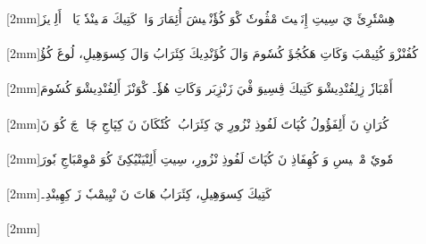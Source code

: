 \documentclass[a4paper, 12pt]{report}
\begin{document}
\begin{flushright}

{\scriptsize{}[2mm]}\textarabic{هِسْتٗرِئَ يَ سِيتِ إِنَلٖيتَ مْڤُوتٗ كْوَ كُؤٗنْيٖيشَ أُئِمَارَ وَاكٖ كَتِيكَ مَتٖينْدٗ يَاكٖ۔ أَلِوٖيزَ} \\ 

 \\ 

{\scriptsize{}[2mm]}\textarabic{كُفُنْزْوَ كُئِيمْبَ وَكَاتِ هَكُجُؤَ كُسٗومَ وَالَ كُؤَنْدِيكَ كِئَرَابُ وَالَ كِسوَهِيلِ، لُوغَ كُؤُ} \\ 

 \\ 

{\scriptsize{}[2mm]}\textarabic{أَمْبَازٗ زِلِفُنْدِيشْوَ كَتِيكَ ڤِسِيوَ ڤْيَ زَنْزِبَر وَكَاتِ هُؤٗ۔ كْوَنْزَ أَلِفُنْدِيشْوَ كُسٗومَ} \\ 

 \\ 

{\scriptsize{}[2mm]}\textarabic{كُرَانِ نَ أَلِفَؤُولُ كُپَاتَ لَفُوذِ نْزُورِ يَ كِئَرَابُ۔ كُتٗكَانَ نَ كِپَاجِ چَاكٖ چَ كُوَ نَ} \\ 

 \\ 

{\scriptsize{}[2mm]}\textarabic{مٗويٗ مْوٖپٖيسِ وَ كُهِفَاذِ نَ كُپَاتَ لَفُوذِ نْزُورِ، سِيتِ أَلِنْيَنْيُكِئَ كُوَ مْوِمْبَاجِ بٗورَ} \\ 

 \\ 

{\scriptsize{}[2mm]}\textarabic{كَتِيكَ كِسوَهِيلِ، كِئَرَابُ هَاتَ نَ نْيِيمْبٗ زَ كِهِينْدِ۔} \\ 

 \\ 

{\scriptsize{}[2mm]}\textarabic{} \\ 


\end{flushright}
\end{document}
